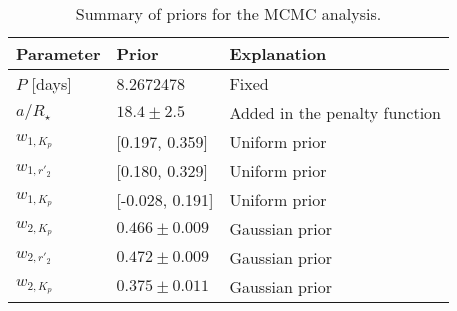 \documentclass[]{pasj01}
\begin{document}
\begin{table}[tb]
\caption{Summary of priors for the MCMC analysis.\label{priortable}}
\begin{tabular}{lll}
\hline
Parameter & Prior & Explanation  \\\hline
$P$ [days] & 8.2672478 & Fixed\\
$a/R_\star$ & $18.4\pm2.5$ & Added in the penalty function\\
$w_{1,K_p}$ & [0.197, 0.359] & Uniform prior\\
$w_{1,r'_2}$ & [0.180, 0.329] & Uniform prior\\
$w_{1,K_p}$ & [-0.028, 0.191] & Uniform prior\\
$w_{2,K_p}$ & $0.466\pm0.009$ & Gaussian prior\\
$w_{2,r'_2}$ & $0.472\pm0.009$ & Gaussian prior\\
$w_{2,K_p}$ & $0.375\pm0.011$ & Gaussian prior\\
\hline
\end{tabular}
\end{table}
\end{document}
